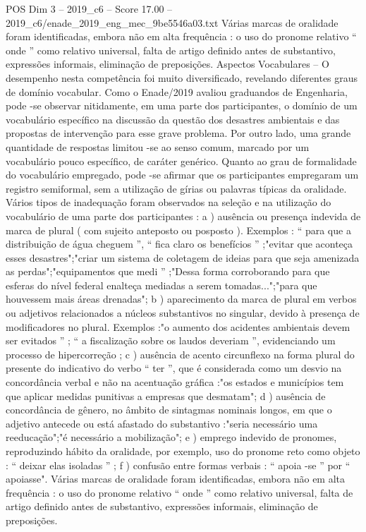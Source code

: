 \begin{textsample}{POS Dim 3 – 2019\_c6 – Score 17.00 – 2019\_c6/enade\_2019\_eng\_mec\_9be5546a03.txt}
Várias marcas de oralidade foram identificadas, embora não em alta frequência : o uso do pronome relativo “ onde ” como relativo universal, falta de artigo definido antes de substantivo, expressões informais, eliminação de preposições.
Aspectos Vocabulares – O desempenho nesta competência foi muito diversificado, revelando diferentes graus de domínio vocabular.
Como o Enade/2019 avaliou graduandos de Engenharia, pode -se observar nitidamente, em uma parte dos participantes, o domínio de um vocabulário específico na discussão da questão dos desastres ambientais e das propostas de intervenção para esse grave problema.
Por outro lado, uma grande quantidade de respostas limitou -se ao senso comum, marcado por um vocabulário pouco específico, de caráter genérico.
Quanto ao grau de formalidade do vocabulário empregado, pode -se afirmar que os participantes empregaram um registro semiformal, sem a utilização de gírias ou palavras típicas da oralidade.
Vários tipos de inadequação foram observados na seleção e na utilização do vocabulário de uma parte dos participantes : a ) ausência ou presença indevida de marca de plural ( com sujeito anteposto ou posposto ).
Exemplos : “ para que a distribuição de água cheguem ”, “ fica claro os benefícios ” ;"evitar que aconteça esses desastres";"criar um sistema de coletagem de ideias para que seja amenizada as perdas";"equipamentos que medi ” ;"Dessa forma corroborando para que esferas do nível federal enalteça mediadas a serem tomadas...";"para que houvessem mais áreas drenadas"; b ) aparecimento da marca de plural em verbos ou adjetivos relacionados a núcleos substantivos no singular, devido à presença de modificadores no plural.
Exemplos :"o aumento dos acidentes ambientais devem ser evitados ” ; “ a fiscalização sobre os laudos deveriam ”, evidenciando um processo de hipercorreção ; c ) ausência de acento circunflexo na forma plural do presente do indicativo do verbo “ ter ”, que é considerada como um desvio na concordância verbal e não na acentuação gráfica :"os estados e municípios tem que aplicar medidas punitivas a empresas que desmatam"; d ) ausência de concordância de gênero, no âmbito de sintagmas nominais longos, em que o adjetivo antecede ou está afastado do substantivo :"seria necessário uma reeducação";"é necessário a mobilização"; e ) emprego indevido de pronomes, reproduzindo hábito da oralidade, por exemplo, uso do pronome reto como objeto : “ deixar elas isoladas ” ; f ) confusão entre formas verbais : “ apoia -se ” por “ apoiasse".
Várias marcas de oralidade foram identificadas, embora não em alta frequência : o uso do pronome relativo “ onde ” como relativo universal, falta de artigo definido antes de substantivo, expressões informais, eliminação de preposições.

\end{textsample}

